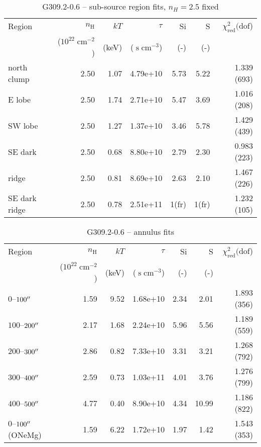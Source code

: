 \documentclass[twocolumn,tighten,trackchanges]{aastex6}
\newcommand*{\mt}{\mathrm}
\newcommand*{\unit}[1]{\;\mt{#1}}  %
\begin{document}
\begin{table*}
    \centering
    \caption{G309.2-0.6 -- sub-source region fits, $n_H=2.5$ fixed}
    \begin{tabular}{@{}lrrrrrr@{}}
        \toprule
        Region & $n_\mathrm{H}$             & $kT$  & $\tau$                & Si  & S   & $\chi^2_{\mathrm{red}} (\mathrm{dof}$) \\
               & ($10^{22} \unit{cm^{-2}}$) & (keV) & ($\unit{s\;cm^{-3}}$) & (-) & (-) &  \\
        \midrule
        north clump & 2.50 & 1.07 & 4.79e+10 & 5.73 & 5.22 & 1.339 (693) \\  %
        E lobe & 2.50 & 1.74 & 2.71e+10 & 5.47 & 3.69 & 1.016 (208) \\  %
        SW lobe & 2.50 & 1.27 & 1.37e+10 & 3.46 & 5.78 & 1.429 (439) \\  %
        SE dark & 2.50 & 0.68 & 8.80e+10 & 2.79 & 2.30 & 0.983 (223) \\  %
        \midrule
        ridge & 2.50 & 0.81 & 8.69e+10 & 2.63 & 2.10 & 1.467 (226) \\  %
        SE dark ridge & 2.50 & 0.78 & 2.51e+11 & 1(fr) & 1(fr) & 1.232 (105) \\  %
        \bottomrule
    \end{tabular}
\end{table*}

\begin{table*}
    \centering
    \caption{G309.2-0.6 -- annulus fits}
    \begin{tabular}{@{}lrrrrrr@{}}
        \toprule
        Region & $n_\mathrm{H}$             & $kT$  & $\tau$                & Si  & S   & $\chi^2_{\mathrm{red}} (\mathrm{dof}$) \\
               & ($10^{22} \unit{cm^{-2}}$) & (keV) & ($\unit{s\;cm^{-3}}$) & (-) & (-) &  \\
        \midrule
        $0$--$100\mbox{$^{\prime\prime}$}$ & 1.59 & 9.52 & 1.68e+10 & 2.34 & 2.01 & 1.893 (356) \\  %
        $100$--$200\mbox{$^{\prime\prime}$}$ & 2.17 & 1.68 & 2.24e+10 & 5.96 & 5.56 & 1.189 (559) \\  %
        $200$--$300\mbox{$^{\prime\prime}$}$ & 2.86 & 0.82 & 7.33e+10 & 3.31 & 3.21 & 1.268 (792) \\  %
        $300$--$400\mbox{$^{\prime\prime}$}$ & 2.59 & 0.73 & 1.03e+11 & 4.01 & 3.76 & 1.276 (799) \\  %
        $400$--$500\mbox{$^{\prime\prime}$}$ & 4.77 & 0.40 & 8.90e+10 & 4.34 & 10.99 & 1.186 (822) \\  %
        \midrule
        $0$--$100\mbox{$^{\prime\prime}$}$ (ONeMg) & 1.59 & 6.22 & 1.72e+10 & 1.97 & 1.42 & 1.543 (353) \\  %
        \bottomrule
    \end{tabular}
\end{table*}
\end{document}
